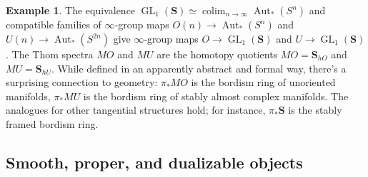 \documentclass{article}
\theoremstyle{definition}
\newtheorem{example}{Example}[subsection]
\renewcommand{\SS}{\mathbf{S}}
\renewcommand{\i}{\infty}
\DeclareMathOperator{\Aut}{Aut}
\DeclareMathOperator{\colim}{colim}
\DeclareMathOperator{\GL}{GL}
\begin{document}
\begin{example}
The equivalence $\GL_1(\SS)\simeq\colim_{n\to\infty}\Aut_*(S^n)$ and compatible families of $\i$-group maps $O(n)\to\Aut_*(S^n)$ and $U(n)\to\Aut_*(S^{2n})$ give $\i$-group maps $O\to\GL_1(\SS)$ and $U\to\GL_1(\SS)$.
The Thom spectra $MO$ and $MU$ are the homotopy quotients $MO=\SS_{hO}$ and $MU=\SS_{hU}$.
While defined in an apparently abstract and formal way, there's a surprising connection to geometry: $\pi_* MO$ is  the bordism ring of unoriented manifolds, $\pi_*MU$ is the bordism ring of stably almost complex manifolds.
The analogues for other tangential structures hold; for instance, $\pi_*\SS$ is the stably framed bordism ring.
\end{example}




\subsection{Smooth, proper, and dualizable objects}
\end{document}
